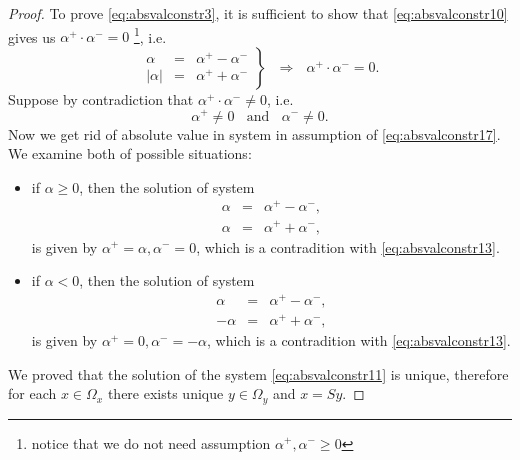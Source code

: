 \begin{proof}
\noindent To prove \eqref{eq:absvalconstr3}, it is sufficient to show that \eqref{eq:absvalconstr10} gives us $\alpha^{+} \cdot \alpha^{-} = 0$
\footnote{notice that we do not need assumption $\alpha^{+},\alpha^{-} \geq 0$}, 
i.e.
\begin{equation}
 \label{eq:absvalconstr17}
 \left.
 \begin{array}{rcl}
  \alpha & = & \alpha^{+} - \alpha^{-} \\
  \vert \alpha \vert & = & \alpha^{+} + \alpha^{-}
 \end{array}
 \right\rbrace ~~~ \Rightarrow
 ~~~ \alpha^{+} \cdot \alpha^{-} = 0.
\end{equation}
Suppose by contradiction that $\alpha^{+} \cdot \alpha^{-} \neq 0$, i.e.
\begin{equation}
 \label{eq:absvalconstr13}
 \alpha^{+} \neq 0 ~~~~ \textrm{and} ~~~~ \alpha^{-} \neq 0.
\end{equation}
Now we get rid of absolute value in system in assumption of \eqref{eq:absvalconstr17}.
We examine both of possible situations:
\begin{itemize}
 \item if $\alpha \geq 0$, then the solution of system
  \begin{displaymath}
   \begin{array}{rcl}
    \alpha & = & \alpha^{+} - \alpha^{-}, \\
    \alpha& = & \alpha^{+} + \alpha^{-}, 
   \end{array}
  \end{displaymath}
  is given by $\alpha^{+} = \alpha, \alpha^{-} = 0$, which is a contradition with \eqref{eq:absvalconstr13}.
 \item if $\alpha < 0$, then the solution of system
  \begin{displaymath}
   \begin{array}{rcl}
    \alpha & = & \alpha^{+} - \alpha^{-}, \\
    -\alpha& = & \alpha^{+} + \alpha^{-}, 
   \end{array}
  \end{displaymath}
  is given by $\alpha^{+} = 0, \alpha^{-} = -\alpha$, which is a contradition with \eqref{eq:absvalconstr13}.
\end{itemize}

We proved that the solution of the system \eqref{eq:absvalconstr11} is unique, therefore for each $x \in \Omega_x$ there exists unique $y \in \Omega_y$ and $x = Sy$.

\end{proof}
